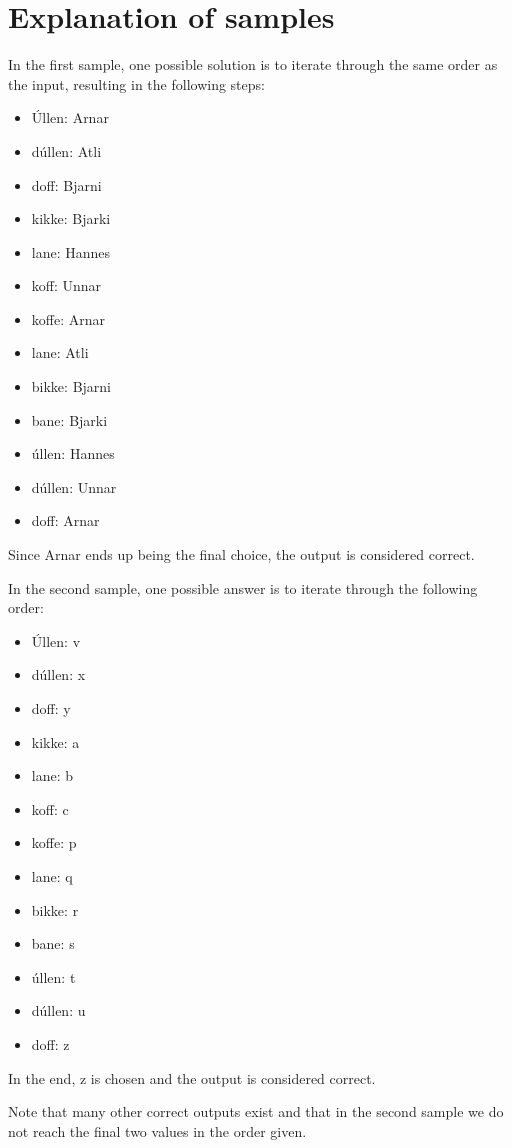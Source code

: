 \section*{Explanation of samples}
In the first sample, one possible solution is to iterate through the same order as the input, resulting in the following steps:

\begin{itemize}
    \item Úllen: Arnar
    \item dúllen: Atli
    \item doff: Bjarni
    \item kikke: Bjarki
    \item lane: Hannes
    \item koff: Unnar
    \item koffe: Arnar
    \item lane: Atli
    \item bikke: Bjarni
    \item bane: Bjarki
    \item úllen: Hannes
    \item dúllen: Unnar
    \item doff: Arnar
\end{itemize}

Since Arnar ends up being the final choice, the output is considered correct.

In the second sample, one possible answer is to iterate through the following order:
\begin{itemize}
    \item Úllen: v
    \item dúllen: x
    \item doff: y
    \item kikke: a
    \item lane: b
    \item koff: c
    \item koffe: p
    \item lane: q
    \item bikke: r
    \item bane: s
    \item úllen: t
    \item dúllen: u
    \item doff: z
\end{itemize}

In the end, z is chosen and the output is considered correct.

Note that many other correct outputs exist and that in the second sample we do not reach the final two values in the order given.
